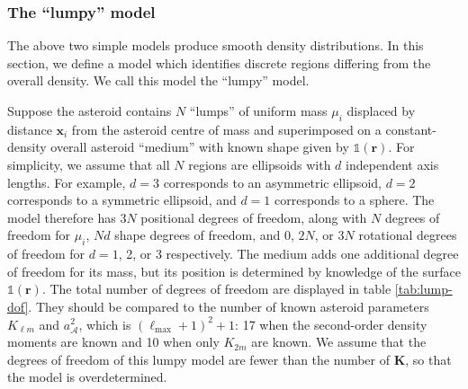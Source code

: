 \documentclass[fleqn,usenatbib]{mnras}
\begin{document}
\subsubsection{The ``lumpy'' model}
\label{sec:lumpy}

The above two simple models produce smooth density distributions. In this section, we define a model which identifies discrete regions differing from the overall density. We call this model the ``lumpy'' model.

Suppose the asteroid contains $N$ ``lumps'' of uniform mass $\mu_i$ displaced by distance $\bm x_i$ from the asteroid centre of mass and superimposed on a constant-density overall asteroid ``medium'' with known shape given by $\mathds{1}(\bm r)$. For simplicity, we assume that all $N$ regions are ellipsoids with $d$ independent axis lengths. For example, $d=3$ corresponds to an asymmetric ellipsoid, $d=2$ corresponds to a symmetric ellipsoid, and $d=1$ corresponds to a sphere. The model therefore has $3N$ positional degrees of freedom, along with $N$ degrees of freedom for $\mu_i$, $Nd$ shape degrees of freedom, and 0, $2N$, or $3N$ rotational degrees of freedom for $d=1$, 2, or 3 respectively. The medium adds one additional degree of freedom for its mass, but its position is determined by knowledge of the surface $\mathds{1}(\bm r)$. The total number of degrees of freedom are displayed in table \ref{tab:lump-dof}. They should be compared to the number of known asteroid parameters $K_{\ell m}$ and $a_\mathcal{A}^2$, which is $(\ell_\text{max}+1)^2+1$: 17 when the second-order density moments are known and 10 when only $K_{2m}$ are known. We assume that the degrees of freedom of this lumpy model are fewer than the number of $\bm K$, so that the model is overdetermined.

\end{document}
